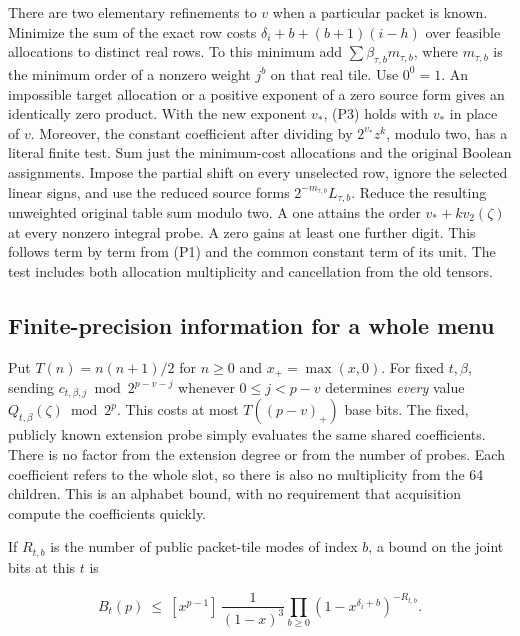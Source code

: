 \documentclass[
  11pt,
]{article}
\begin{document}
There are two elementary refinements to \(v\) when a particular packet
is known. Minimize the sum of the exact row costs
\(\delta_i+b+(b+1)(i-h)\) over feasible allocations to distinct real
rows. To this minimum add \(\sum\beta_{\tau,b}m_{\tau,b}\), where
\(m_{\tau,b}\) is the minimum order of a nonzero weight \(j^b\) on that
real tile. Use \(0^0=1\). An impossible target allocation or a positive
exponent of a zero source form gives an identically zero product. With
the new exponent \(v_*\), (P3) holds with \(v_*\) in place of \(v\).
Moreover, the constant coefficient after dividing by \(2^{v_*}z^k\),
modulo two, has a literal finite test. Sum just the minimum-cost
allocations and the original Boolean assignments. Impose the partial
shift on every unselected row, ignore the selected linear signs, and use
the reduced source forms \(2^{-m_{\tau,b}}L_{\tau,b}\). Reduce the
resulting unweighted original table sum modulo two. A one attains the
order \(v_*+k v_2(\zeta)\) at every nonzero integral probe. A zero gains
at least one further digit. This follows term by term from (P1) and the
common constant term of its unit. The test includes both allocation
multiplicity and cancellation from the old tensors.

\subsection{Finite-precision information for a whole
menu}\label{v9-finite-precision-information-for-a-whole-menu}

Put \(T(n)=n(n+1)/2\) for \(n\ge0\) and \(x_+=\max(x,0)\). For fixed
\(t,\beta\), sending \(c_{t,\beta,j}\bmod 2^{p-v-j}\) whenever
\(0\le j<p-v\) determines \emph{every} value
\(Q_{t,\beta}(\zeta)\bmod 2^p\). This costs at most \(T((p-v)_+)\) base
bits. The fixed, publicly known extension probe simply evaluates the
same shared coefficients. There is no factor from the extension degree
or from the number of probes. Each coefficient refers to the whole slot,
so there is also no multiplicity from the 64 children. This is an
alphabet bound, with no requirement that acquisition compute the
coefficients quickly.

If \(R_{t,b}\) is the number of public packet-tile modes of index \(b\),
a bound on the joint bits at this \(t\) is

\[
 B_t(p)\ \le\ [x^{p-1}]\,
 \frac{1}{(1-x)^3}\prod_{b\ge0}(1-x^{\delta_i+b})^{-R_{t,b}}.
 \tag{P4}
\]
\end{document}
